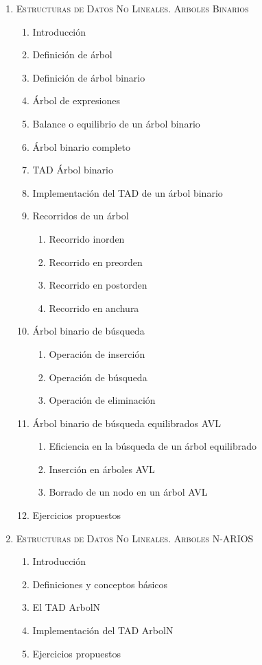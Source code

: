 \begin{enumerate}
	\item \textsc{Estructuras de Datos No Lineales. Arboles Binarios}
	\begin{enumerate}
		\item Introducción
		\item Definición de árbol
		\item Definición de árbol binario
		\item Árbol de expresiones
		\item Balance o equilibrio de un árbol binario
		\item Árbol binario completo
		\item TAD Árbol binario
		\item Implementación del TAD de un árbol binario
		\item Recorridos de un árbol
		\begin{enumerate}
			\item Recorrido inorden
			\item Recorrido en preorden
			\item Recorrido en postorden
			\item Recorrido en anchura
		\end{enumerate}		
		\item Árbol binario de búsqueda
		\begin{enumerate}
			\item Operación de inserción
			\item Operación de búsqueda
			\item Operación de eliminación
		\end{enumerate}	
		\item Árbol binario de búsqueda equilibrados AVL
		\begin{enumerate}
			\item Eficiencia en la búsqueda de un árbol equilibrado
			\item Inserción en árboles AVL
			\item Borrado de un nodo en un árbol AVL
		\end{enumerate}	
		\item Ejercicios propuestos
	\end{enumerate}	
			
	\item \textsc{Estructuras de Datos No Lineales. Arboles N-ARIOS}
	\begin{enumerate}
		\item Introducción
		\item Definiciones y conceptos básicos
		\item El TAD ArbolN
		\item Implementación del TAD ArbolN
		\item Ejercicios propuestos
	\end{enumerate}	
					

\end{enumerate}
